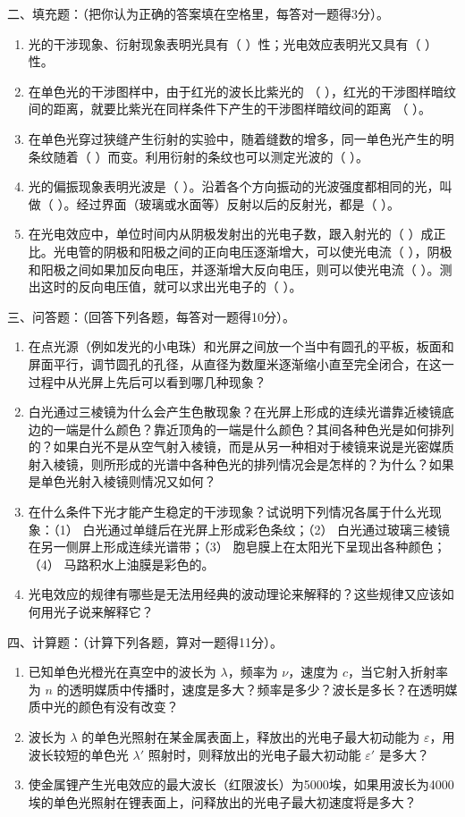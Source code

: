 二、填充题：（把你认为正确的答案填在空格里，每答对一题得3分）。

\begin{enumerate}
\item
  光的干涉现象、衍射现象表明光具有（ ）性；光电效应表明光又具有（ ）性。
\item
  在单色光的干涉图样中，由于红光的波长比紫光的 （
  ），红光的干涉图样暗纹间的距离，就要比紫光在同样条件下产生的干涉图样暗纹间的距离
  （ ）。
\item
  在单色光穿过狭缝产生衍射的实验中，随着缝数的增多，同一单色光产生的明条纹随着（
  ）而变。利用衍射的条纹也可以测定光波的（ ）。
\item
  光的偏振现象表明光波是（
  ）。沿着各个方向振动的光波强度都相同的光，叫做（
  ）。经过界面（玻璃或水面等）反射以后的反射光，都是（ ）。
\item
  在光电效应中，单位时间内从阴极发射出的光电子数，跟入射光的（
  ）成正比。光电管的阴极和阳极之间的正向电压逐渐增大，可以使光电流（
  ），阴极和阳极之间如果加反向电压，并逐渐增大反向电压，则可以使光电流（
  ）。测出这时的反向电压值，就可以求出光电子的（ ）。
\end{enumerate}

三、问答题：（回答下列各题，每答对一题得10分）。

\begin{enumerate}
\item
  在点光源（例如发光的小电珠）和光屏之间放一个当中有圆孔的平板，板面和屏面平行，调节圆孔的孔径，从直径为数厘米逐渐缩小直至完全闭合，在这一过程中从光屏上先后可以看到哪几种现象？
\item
  白光通过三棱镜为什么会产生色散现象？在光屏上形成的连续光谱靠近棱镜底边的一端是什么颜色？靠近顶角的一端是什么颜色？其间各种色光是如何排列的？如果白光不是从空气射入棱镜，而是从另一种相对于棱镜来说是光密媒质射入棱镜，则所形成的光谱中各种色光的排列情况会是怎样的？为什么？如果是单色光射入棱镜则情况又如何？
\item
  在什么条件下光才能产生稳定的干涉现象？试说明下列情况各属于什么光现象：（1）
  白光通过单缝后在光屏上形成彩色条纹；（2）
  白光通过玻璃三棱镜在另一侧屏上形成连续光谱带；（3）
  胞皂膜上在太阳光下呈现出各种颜色；（4） 马路积水上油膜是彩色的。
\item
  光电效应的规律有哪些是无法用经典的波动理论来解释的？这些规律又应该如何用光子说来解释它？
\end{enumerate}

四、计算题：（计算下列各题，算对一题得11分）。

\begin{enumerate}
\item
  已知单色光橙光在真空中的波长为 \(\lambda\)，频率为 \(\nu\)，速度为
  \(c\)，当它射入折射率为 \(n\)
  的透明媒质中传播时，速度是多大？频率是多少？波长是多长？在透明媒质中光的颜色有没有改变？
\item
  波长为 \(\lambda\)
  的单色光照射在某金属表面上，释放出的光电子最大初动能为
  \(\varepsilon\)，用波长较短的单色光 \(\lambda'\)
  照射时，则释放出的光电子最大初动能 \(\varepsilon'\) 是多大？
\item
  使金属锂产生光电效应的最大波长（红限波长）为5000埃，如果用波长为4000埃的单色光照射在锂表面上，问释放出的光电子最大初速度将是多大？
\end{enumerate}

